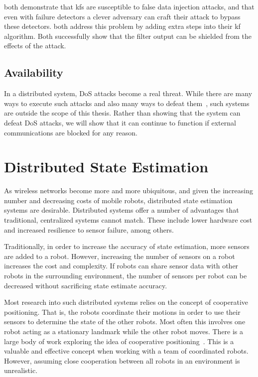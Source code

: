 \documentclass[thesis.tex]{subfile}
\begin{document}
\textcite{Mo2010, Yang2013} both demonstrate that \glspl{kf} are susceptible to false data injection attacks, and that even with failure detectors a clever adversary can craft their attack to bypass these detectors. \textcite{Bezzo_2014, Mo2014} both address this problem by adding extra steps into their \gls{kf} algorithm. Both successfully show that the filter output can be shielded from the effects of the attack.

\subsection{Availability}
In a distributed system, \gls{DoS} attacks become a real threat. While there are many ways to execute such attacks and also many ways to defeat them~\cite{wood2002denial, bellardo2003802}, such systems are outside the scope of this thesis. Rather than showing that the system can defeat \gls{DoS} attacks, we will show that it can continue to function if external communications are blocked for any reason.

\section{Distributed State Estimation}
As wireless networks become more and more ubiquitous, and given the increasing number and decreasing costs of mobile robots, distributed state estimation systems are desirable. Distributed systems offer a number of advantages that traditional, centralized systems cannot match. These include lower hardware cost and increased resilience to sensor failure, among others.

Traditionally, in order to increase the accuracy of state estimation, more sensors are added to a robot. However, increasing the number of sensors on a robot increases the cost and complexity. If robots can share sensor data with other robots in the surrounding environment, the number of sensors per robot can be decreased without sacrificing state estimate accuracy.

Most research into such distributed systems relies on the concept of cooperative positioning. That is, the robots coordinate their motions in order to use their sensors to determine the state of the other robots. Most often this involves one robot acting as a stationary landmark while the other robot moves.  There is a large body of work exploring the idea of cooperative positioning~\cite{Kurazume1994, Kurazume1996, Kurazume1998, Kurazume2000}. This is a valuable and effective concept when working with a team of coordinated robots. However, assuming close cooperation between all robots in an environment is unrealistic.
\end{document}
